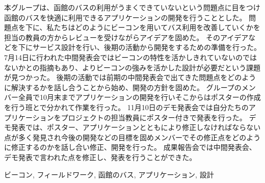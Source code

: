 \documentclass[openany,11pt,papersize]{jsbook}
\begin{document}
  \maketitle
  
  \frontmatter
  
  \begin{jabstract}
  
  
  

本グループは、函館のバスの利用がうまくできていないという問題点に目をつけ函館のバスを快適に利用できるアプリケーションの開発を行うこととした。
問題点を下に、私たちはどのようにビーコンを用いてバス利用を改善していくかを担当の教員の方からレビューを受けながらアイデアを固めた。
そのアイデアなどを下にサービス設計を行い、後期の活動から開発をするための準備を行った。
7月14日に行われた中間発表会ではビーコンの特性を活かしきれていないのではないかとの指摘もあり、よりビーコンの強みを活かした設計が必要だという課題が見つかった。
後期の活動では前期の中間発表会で出てきた問題点をどのように解決するかを話し合うことから始め、開発の方針を固めた。
グループのメンバー全員で10月末までアプリケーションの開発を行いそこからはポスターの作成を行う班とで分かれて作業を行った。
11月10日のデモ発表会では自分たちのアプリケーションをプロジェクトの担当教員にポスター付きで発表を行った。
デモ発表では、ポスター、アプリケーションとともにより修正しなければならない点が多く発見され今後の開発などの目標を固めメンバーでその修正点をどのように修正するのかを話し合い修正、開発を行った。
成果報告会では中間発表会、デモ発表で言われた点を修正し、発表を行うことができた。

\begin{jkeyword}
ビーコン, フィールドワーク, 函館のバス, アプリケーション, 設計
\end{jkeyword}
\end{jabstract}
\end{document}
